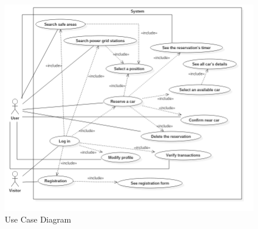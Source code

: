 \begin{figure}[htbp]
\centering
\includegraphics[width=\textwidth]{Images/UML/UseCase}
\caption{Use Case Diagram}
\label{fig:use case}
\end{figure}
\clearpage


